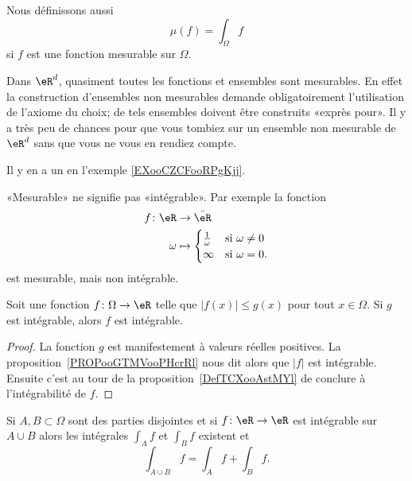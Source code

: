 Nous définissons aussi
\begin{equation}
    \mu(f)=\int_{\Omega}f
\end{equation}
si \( f\) est une fonction mesurable sur \( \Omega\).

\begin{remark}
    Dans \( \eR^d\), quasiment toutes les fonctions et ensembles sont mesurables. En effet la construction d'ensembles non mesurables demande obligatoirement l'utilisation de l'axiome du choix; de tels ensembles doivent être construits «exprès pour». Il y a très peu de chances pour que vous tombiez sur un ensemble non mesurable de \( \eR^d\) sans que vous ne vous en rendiez compte.

    Il y en a un en l'exemple \ref{EXooCZCFooRPgKjj}.
\end{remark}

\begin{remark}
    «Mesurable» ne signifie pas «intégrable». Par exemple la fonction
    \begin{equation}
        \begin{aligned}
            f\colon \eR&\to \bar\eR \\
            \omega&\mapsto\begin{cases}
            \frac{1}{ \omega }    &   \text{si } \omega\neq 0\\
            \infty    &    \text{si }\omega=0.
            \end{cases}
        \end{aligned}
    \end{equation}
    est mesurable, mais non intégrable.
\end{remark}

\begin{lemma}   \label{LemPfHgal}
    Soit une fonction \( f\colon \Omega\to \eR\) telle que \( | f(x)|\leq g(x) \) pour tout \( x\in\Omega\). Si \( g\) est intégrable, alors \( f\) est intégrable.
\end{lemma}

\begin{proof}
    La fonction \( g\) est manifestement à valeurs réelles positives. La proposition~\ref{PROPooGTMVooPHcrRl} nous dit alors que \( | f |\) est intégrable. Ensuite c'est au tour de la proposition~\ref{DefTCXooAstMYl} de conclure à l'intégrabilité de \( f\).
\end{proof}

\begin{proposition}     \label{PropOPSCooVpzaBt}
    Si \( A,B\subset \Omega\) sont des parties disjointes et si \( f\colon \eR\to \eR\) est intégrable sur \( A\cup B\) alors les intégrales \( \int_Af\) et \( \int_Bf\) existent et
    \begin{equation}
        \int_{A\cup B}f=\int_Af+\int_Bf.
    \end{equation}
\end{proposition}


